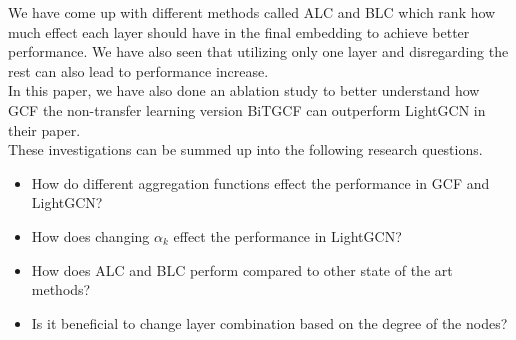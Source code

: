 We have come up with different methods called ALC and BLC which rank how much effect each layer should have in the final embedding to achieve better performance.
We have also seen that utilizing only one layer and disregarding the rest can also lead to performance increase.
\\
In this paper, we have also done an ablation study to better understand how GCF the non-transfer learning version BiTGCF can outperform LightGCN in their paper.
\\
These investigations can be summed up into the following research questions.
\begin{itemize}
    \item How do different aggregation functions effect the performance in GCF and LightGCN?
    \item How does changing $\alpha_k$ effect the performance in LightGCN?
    \item How does ALC and BLC perform compared to other state of the art methods?
    \item Is it beneficial to change layer combination based on the degree of the nodes?
\end{itemize}

